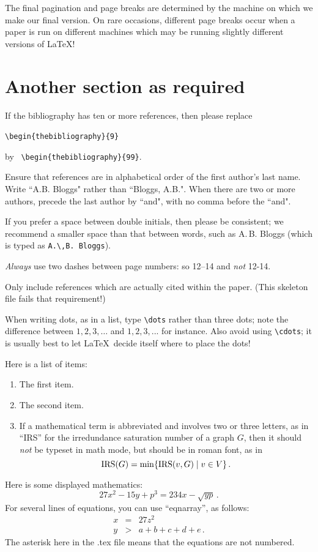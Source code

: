 \documentclass[12pt]{article}
\numberwithin{equation}{section}
\begin{document}
The final pagination and page breaks are determined by the machine on which 
we make our final version.
On rare occasions, different page breaks occur when a paper is run on different machines
which may be running slightly different versions of \LaTeX!

\section{Another section as required}

If the bibliography has ten or more references, 
then please  replace 
\begin{center}
\verb|\begin{thebibliography}{9}| \
\end{center}
by \ \verb|\begin{thebibliography}{99}|.

Ensure that references are in alphabetical order of the first author's last name.
Write ``A.B. Bloggs" rather than ``Bloggs, A.B.".
When there are two or more authors, 
precede the last author by ``and", with no comma before the ``and".

If you prefer a space between double initials, then please be consistent; 
we recommend a smaller space than that between words, such as
A.\,B. Bloggs (which is typed as \verb|A.\,B. Bloggs|).

{\it Always\/} use two dashes between page numbers: so 12--14 and {\it not\/} 12-14.

Only include references which are actually cited within the paper. (This skeleton file fails
that requirement!)

When writing dots, as in a list, type \verb|\dots| rather than three dots;
note the difference between $1,2,3,\dots$ and $1,2,3,...$ for instance.
Also avoid using \verb|\cdots|; it is usually
best to let \LaTeX\ decide itself where to place the dots!

Here is a list of items:
\begin{enumerate}
\item
The first item.
\item
The second item.
\item
If a mathematical term is abbreviated and involves two or three letters,
as in ``IRS'' for the irredundance saturation number of a graph $G$,
then it should {\em not\/} be typeset in math mode, but should be in roman font, as in
\[
  {\rm IRS}(G) = \min\{{\rm IRS}(v,G) \mid v \in V\}\,.
\]
\end{enumerate}
Here is some displayed mathematics:
\[
  27x^2-15y+p^3 = 234x-\sqrt{yp}\,.
\]
For several lines of equations, you can use ``eqnarray'', as follows:
\begin{eqnarray*}
  x &=& 27z^2\\
  y &>& a+b+c+d+e\,.
\end{eqnarray*}
The asterisk here in the .tex file means that the equations are not numbered.
\end{document}
